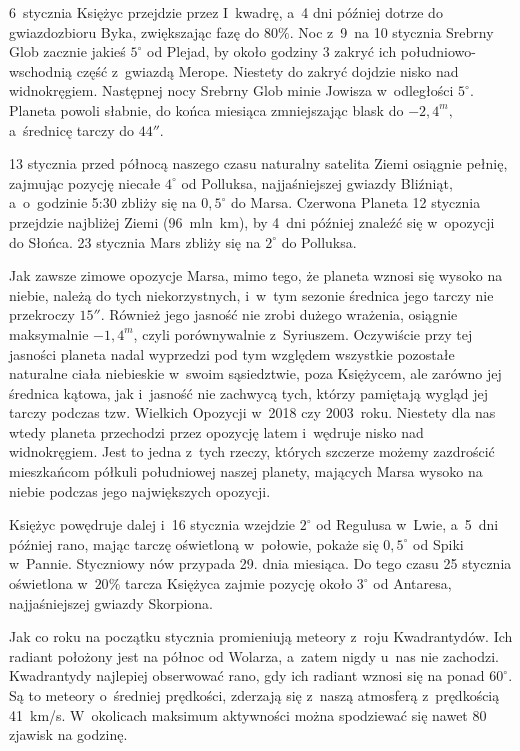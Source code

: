 {\begin{dwieszpalty}
6~stycznia Księżyc przejdzie przez I~kwadrę, a~4 dni później dotrze do gwiazdozbioru Byka, zwiększając fazę do $80\%$. Noc z~9~na 10 stycznia Srebrny Glob zacznie jakieś $5^{\circ}$ od Plejad, by około godziny 3 zakryć ich południowo-wschodnią część z~gwiazdą Merope. Niestety do zakryć dojdzie nisko nad widnokręgiem. Następnej nocy Srebrny Glob minie Jowisza w~odległości $5^{\circ}$. Planeta powoli słabnie, do końca miesiąca zmniejszając blask do $-2,4^m,$ a~średnicę tarczy do $44''$.

13 stycznia przed północą naszego czasu naturalny satelita Ziemi osiągnie pełnię, zajmując pozycję niecałe $4^{\circ}$ od Polluksa, najjaśniejszej gwiazdy Bliźniąt, a~o~godzinie 5:30 zbliży się na $0,5^{\circ}$ do Marsa. Czerwona Planeta 12 stycznia przejdzie najbliżej Ziemi (96~mln~km), by 4~dni później znaleźć się w~opozycji do Słońca. 23 stycznia Mars zbliży się na $2^{\circ}$ do Polluksa.

Jak zawsze zimowe opozycje Marsa, mimo tego, że planeta wznosi się wysoko na niebie, należą do tych niekorzystnych, i~w~tym sezonie średnica jego tarczy nie przekroczy $15''$. Również jego jasność nie zrobi dużego wrażenia, osiągnie maksymalnie $-1,4^m$, czyli porównywalnie z~Syriuszem. Oczywiście przy tej jasności planeta nadal wyprzedzi pod tym względem wszystkie pozostałe naturalne ciała niebieskie w~swoim sąsiedztwie, poza Księżycem, ale zarówno jej średnica kątowa, jak i~jasność nie zachwycą tych, którzy pamiętają wygląd jej tarczy podczas tzw. Wielkich Opozycji w~2018 czy 2003~roku. Niestety dla nas wtedy planeta przechodzi przez opozycję latem i~wędruje nisko nad widnokręgiem. Jest to jedna z~tych rzeczy, których szczerze możemy zazdrościć mieszkańcom półkuli południowej naszej planety, mających Marsa wysoko na niebie podczas jego największych opozycji. 

Księżyc powędruje dalej i~16 stycznia wzejdzie $2^{\circ}$ od Regulusa w~Lwie, a~5~dni później rano, mając tarczę oświetloną w~połowie, pokaże się $0,5^{\circ}$ od Spiki w~Pannie. Styczniowy nów przypada 29. dnia miesiąca. Do tego czasu 25 stycznia oświetlona w~$20\%$ tarcza Księżyca zajmie pozycję około $3^{\circ}$ od Antaresa, najjaśniejszej gwiazdy Skorpiona. 

Jak co roku na początku stycznia promieniują meteory z~roju Kwadrantydów. Ich radiant położony jest na północ od Wolarza, a~zatem nigdy u~nas nie zachodzi. Kwadrantydy najlepiej obserwować rano, gdy ich radiant wznosi się na ponad $60^{\circ}$. Są to meteory o~średniej prędkości, zderzają się z~naszą atmosferą z~prędkością 41~km/s. W~okolicach maksimum aktywności można spodziewać się nawet 80 zjawisk na godzinę.


\end{dwieszpalty}}
